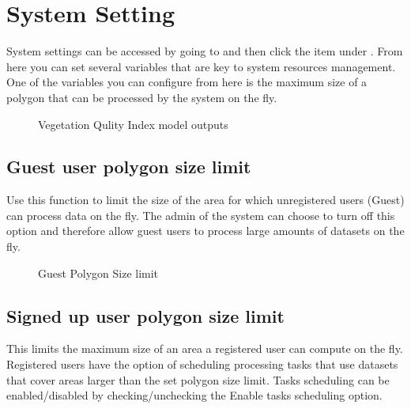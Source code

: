 \documentclass[letterpaper,10pt,english]{sphinxmanual}
\let\sphinxpxdimen\pdfpxdimen\else\newdimen\sphinxpxdimen
\begin{document}
\section{System Setting}
\label{\detokenize{Introduction/admin:system-setting}}
\sphinxAtStartPar
System settings can be accessed by going to  and then click the item under . From here you can set several variables that are key to system resources management. One of the variables you can configure from here is the maximum size of a polygon that can be processed by the system on the fly.

\begin{figure}[H]
\centering
\capstart

\noindent\sphinxincludegraphics[width=750\sphinxpxdimen,height=577\sphinxpxdimen]{{admin1}.png}
\caption{Vegetation Qulity Index model outputs}\label{\detokenize{Introduction/admin:id1}}\end{figure}


\subsection{Guest user polygon size limit}
\label{\detokenize{Introduction/admin:guest-user-polygon-size-limit}}
\sphinxAtStartPar
Use this function to limit the size of the area for which unregistered users (Guest) can process data on the fly. The admin of the system can choose to turn off this option and therefore allow guest users to process large amounts of datasets on the fly.

\begin{figure}[H]
\centering
\capstart

\noindent\sphinxincludegraphics[width=744\sphinxpxdimen,height=584\sphinxpxdimen]{{admin3}.png}
\caption{Guest Polygon Size limit}\label{\detokenize{Introduction/admin:id2}}\end{figure}


\subsection{Signed up user polygon size limit}
\label{\detokenize{Introduction/admin:signed-up-user-polygon-size-limit}}
\sphinxAtStartPar
This limits the maximum size of an area a registered user can compute on the fly. Registered users have the option of scheduling processing tasks that use datasets that cover areas larger than the set polygon size limit. Tasks scheduling can be enabled/disabled by checking/unchecking the Enable tasks scheduling option.
\end{document}
